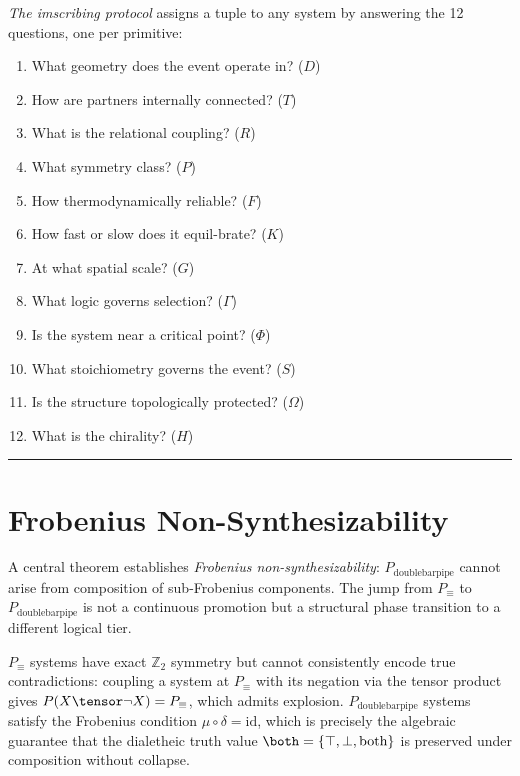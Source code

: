 \documentclass[12pt,a4paper]{article}
\newcommand{\Ppms}{P_{\text{doublebarpipe}}}
\begin{document}
\textit{The imscribing protocol} assigns a tuple to any system by answering the 12 questions, one per primitive:
\begin{enumerate}
    \item What geometry does the event operate in? ($D$)
    \item How are partners internally connected? ($T$)
    \item What is the relational coupling? ($R$)
    \item What symmetry class? ($P$)
    \item How thermodynamically reliable? ($F$)
    \item How fast or slow does it equil-brate? ($K$)
    \item At what spatial scale? ($G$)
    \item What logic governs selection? ($\Gamma$)
    \item Is the system near a critical point? ($\Phi$)
    \item What stoichiometry governs the event? ($S$)
    \item Is the structure topologically protected? ($\Omega$)
    \item What is the chirality? ($H$)
\end{enumerate}

\begin{center}
\rule{0.5\textwidth}{0.4pt}
\end{center}

\section{Frobenius Non-Synthesizability}

A central theorem establishes \emph{Frobenius non-synthesizability}: $\Ppms$ cannot arise from composition of sub-Frobenius components. The jump from $P_\equiv$ to $\Ppms$ is not a continuous promotion but a structural phase transition to a different logical tier.

$P_\equiv$ systems have exact $\mathbb{Z}_2$ symmetry but cannot consistently encode true contradictions: coupling a system at $P_\equiv$ with its negation via the tensor product gives $P(X \tensor \neg X) = P_\equiv$, which admits explosion. $\Ppms$ systems satisfy the Frobenius condition $\mu \circ \delta = \text{id}$, which is precisely the algebraic guarantee that the dialetheic truth value $\both = \{\top, \bot, \text{both}\}$ is preserved under composition without collapse.
\end{document}
